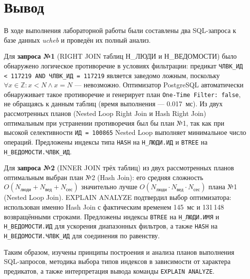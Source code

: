 \documentclass[12pt,a4paper]{article}
\begin{document}
\newpage

\section{Вывод}

В ходе выполнения лабораторной работы были составлены два SQL-запроса к базе
данных \textit{ucheb} и проведён их полный анализ.

Для \textbf{запроса №1} (RIGHT JOIN таблиц Н\_ЛЮДИ и Н\_ВЕДОМОСТИ) было
обнаружено логическое противоречие в условиях фильтрации: предикат
\texttt{ЧЛВК\_ИД < 117219 AND ЧЛВК\_ИД = 117219} является заведомо ложным,
поскольку $\forall x \in \mathbb{Z}: x < N \land x = N$ --- невозможно.
Оптимизатор PostgreSQL автоматически обнаруживает такое противоречие и
генерирует план \texttt{One-Time Filter: false}, не обращаясь к данным таблиц
(время выполнения --- 0.017~мс). Из двух рассмотренных планов (Nested Loop
Right Join и Hash Right Join) оптимальным при устранении противоречия был бы
план №1, так как при высокой селективности \texttt{ИД = 100865} Nested Loop
выполняет минимальное число операций. Предложены индексы типа \texttt{HASH}
на \texttt{Н\_ЛЮДИ.ИД} и \texttt{BTREE} на \texttt{Н\_ВЕДОМОСТИ.ЧЛВК\_ИД}.

Для \textbf{запроса №2} (INNER JOIN трёх таблиц) из двух рассмотренных
планов оптимальным выбран план №2 (Hash Join): его средняя сложность
$O(N_\text{люди} + N_\text{вед} + N_\text{сес})$ значительно лучше
$O(N_\text{люди} \cdot N_\text{вед} \cdot N_\text{сес})$ плана №1 (Nested
Loop Join). EXPLAIN ANALYZE подтвердил выбор оптимизатора: использован именно
Hash Join с фактическим временем 145~мс и 131\,148 возвращёнными строками.
Предложены индексы \texttt{BTREE} на \texttt{Н\_ЛЮДИ.ИМЯ} и
\texttt{Н\_ВЕДОМОСТИ.ИД} для ускорения диапазонных фильтров, а также
\texttt{HASH} на \texttt{Н\_ВЕДОМОСТИ.ЧЛВК\_ИД} для соединения по равенству.

Таким образом, изучены принципы построения и анализа планов выполнения
SQL-запросов, методика выбора типов индексов в зависимости от характера
предикатов, а также интерпретация вывода команды \texttt{EXPLAIN ANALYZE}.
\end{document}
